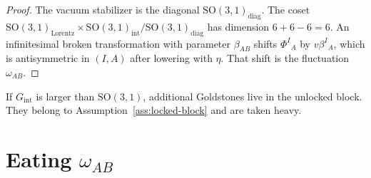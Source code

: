 \begin{proof}
  The vacuum stabilizer is the diagonal
  \(\mathrm{SO}(3,1)_{\mathrm{diag}}\). The coset
  \(\mathrm{SO}(3,1)_{\mathrm{Lorentz}}\times
   \mathrm{SO}(3,1)_{\mathrm{int}}/\mathrm{SO}(3,1)_{\mathrm{diag}}\)
  has dimension \(6+6-6=6\). An infinitesimal broken transformation
  with parameter \(\beta_{AB}\) shifts
  \(\Phi^I{}_A\) by \(v\beta^I{}_A\), which is antisymmetric in
  \((I,A)\) after lowering with \(\eta\). That shift is the
  fluctuation \(\omega_{AB}\).
\end{proof}

If \(G_{\mathrm{int}}\) is larger than \(\mathrm{SO}(3,1)\),
additional Goldstones live in the unlocked block. They belong to
Assumption~\ref{ass:locked-block} and are taken heavy.

\section{Eating \(\omega_{AB}\)}
\label{sec:ch10-eat}

